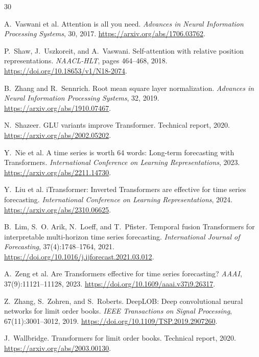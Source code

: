 \documentclass[10pt,letterpaper]{article}
\numberwithin{equation}{section}
\theoremstyle{definition}
\theoremstyle{remark}
\begin{document}
\small
\begin{thebibliography}{30}

A.~Vaswani et al.
\newblock Attention is all you need.
\newblock \emph{Advances in Neural Information Processing Systems}, 30, 2017.
\newblock \url{https://arxiv.org/abs/1706.03762}.

P.~Shaw, J.~Uszkoreit, and A.~Vaswani.
\newblock Self-attention with relative position representations.
\newblock \emph{NAACL-HLT}, pages 464--468, 2018.
\newblock \url{https://doi.org/10.18653/v1/N18-2074}.

B.~Zhang and R.~Sennrich.
\newblock Root mean square layer normalization.
\newblock \emph{Advances in Neural Information Processing Systems}, 32, 2019.
\newblock \url{https://arxiv.org/abs/1910.07467}.

N.~Shazeer.
\newblock GLU variants improve Transformer.
\newblock Technical report, 2020.
\newblock \url{https://arxiv.org/abs/2002.05202}.

Y.~Nie et al.
\newblock A time series is worth 64 words: Long-term forecasting with
Transformers.
\newblock \emph{International Conference on Learning Representations}, 2023.
\newblock \url{https://arxiv.org/abs/2211.14730}.

Y.~Liu et al.
\newblock iTransformer: Inverted Transformers are effective for time series
forecasting.
\newblock \emph{International Conference on Learning Representations}, 2024.
\newblock \url{https://arxiv.org/abs/2310.06625}.

B.~Lim, S.~O. Arik, N.~Loeff, and T.~Pfister.
\newblock Temporal fusion Transformers for interpretable multi-horizon time
series forecasting.
\newblock \emph{International Journal of Forecasting}, 37(4):1748--1764, 2021.
\newblock \url{https://doi.org/10.1016/j.ijforecast.2021.03.012}.

A.~Zeng et al.
\newblock Are Transformers effective for time series forecasting?
\newblock \emph{AAAI}, 37(9):11121--11128, 2023.
\newblock \url{https://doi.org/10.1609/aaai.v37i9.26317}.

Z.~Zhang, S.~Zohren, and S.~Roberts.
\newblock DeepLOB: Deep convolutional neural networks for limit order books.
\newblock \emph{IEEE Transactions on Signal Processing}, 67(11):3001--3012,
2019.
\newblock \url{https://doi.org/10.1109/TSP.2019.2907260}.

J.~Wallbridge.
\newblock Transformers for limit order books.
\newblock Technical report, 2020.
\newblock \url{https://arxiv.org/abs/2003.00130}.


\end{thebibliography}
\end{document}
